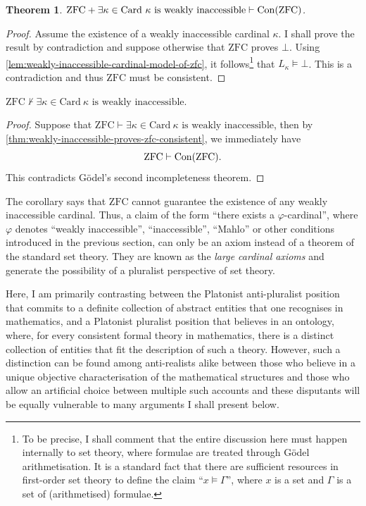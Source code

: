 \documentclass[12pt]{article}
\theoremstyle{plain}
\newtheorem{theorem}{Theorem}[section]
\theoremstyle{definition}
\newcommand{\ZFC}{\mathrm{ZFC}}
\newcommand{\Card}{\mathrm{Card}}
\DeclareMathOperator{\Con}{Con}
\begin{document}
\begin{theorem}
	\label{thm:weakly-inaccessible-proves-zfc-consistent}
	$\ZFC + \exists \kappa \in \Card \ \text{$\kappa$ is weakly inaccessible} \vdash \Con\mleft(\ZFC\mright)$.
\end{theorem}

\begin{proof}
	Assume the existence of a weakly inaccessible cardinal $\kappa$. I shall prove the result by contradiction and suppose otherwise that $\ZFC$ proves $\bot$. Using \autoref{lem:weakly-inaccessible-cardinal-model-of-zfc}, it follows\footnote{To be precise, I shall comment that the entire discussion here must happen internally to set theory, where formulae are treated through G\"odel arithmetisation. It is a standard fact that there are sufficient resources in first-order set theory to define the claim ``$x \vDash \Gamma$'', where $x$ is a set and $\Gamma$ is a set of (arithmetised) formulae.} that $L_\kappa \vDash \bot$. This is a contradiction and thus $\ZFC$ must be consistent.
\end{proof}

\begin{corollary}
	$\ZFC \nvdash \exists \kappa \in \Card \ \text{$\kappa$ is weakly inaccessible}$.
\end{corollary}

\begin{proof}
	Suppose that $\ZFC \vdash \exists \kappa \in \Card \ \text{$\kappa$ is weakly inaccessible}$, then by \autoref{thm:weakly-inaccessible-proves-zfc-consistent}, we immediately have
	\[\ZFC \vdash \Con\mleft(\ZFC\mright).\]
	This contradicts G\"odel's second incompleteness theorem.
\end{proof}

The corollary says that $\ZFC$ cannot guarantee the existence of any weakly inaccessible cardinal. Thus, a claim of the form ``there exists a $\varphi$-cardinal'', where $\varphi$ denotes ``weakly inaccessible'', ``inaccessible'', ``Mahlo'' or other conditions introduced in the previous section, can only be an axiom instead of a theorem of the standard set theory. They are known as the \emph{large cardinal axioms} and generate the possibility of a pluralist perspective of set theory.

Here, I am primarily contrasting between the Platonist anti-pluralist position that commits to a definite collection of abstract entities that one recognises in mathematics, and a Platonist pluralist position that believes in an ontology, where, for every consistent formal theory in mathematics, there is a distinct collection of entities that fit the description of such a theory. However, such a distinction can be found among anti-realists alike between those who believe in a unique objective characterisation of the mathematical structures and those who allow an artificial choice between multiple such accounts and these disputants will be equally vulnerable to many arguments I shall present below.
\end{document}
